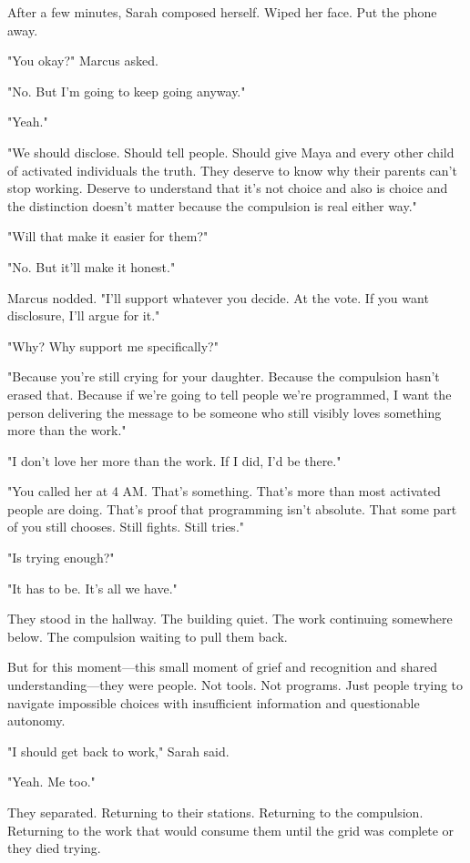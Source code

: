 After a few minutes, Sarah composed herself. Wiped her face. Put the phone away.

"You okay?" Marcus asked.

"No. But I'm going to keep going anyway."

"Yeah."

"We should disclose. Should tell people. Should give Maya and every other child of activated individuals the truth. They deserve to know why their parents can't stop working. Deserve to understand that it's not choice and also is choice and the distinction doesn't matter because the compulsion is real either way."

"Will that make it easier for them?"

"No. But it'll make it honest."

Marcus nodded. "I'll support whatever you decide. At the vote. If you want disclosure, I'll argue for it."

"Why? Why support me specifically?"

"Because you're still crying for your daughter. Because the compulsion hasn't erased that. Because if we're going to tell people we're programmed, I want the person delivering the message to be someone who still visibly loves something more than the work."

"I don't love her more than the work. If I did, I'd be there."

"You called her at 4 AM. That's something. That's more than most activated people are doing. That's proof that programming isn't absolute. That some part of you still chooses. Still fights. Still tries."

"Is trying enough?"

"It has to be. It's all we have."

They stood in the hallway. The building quiet. The work continuing somewhere below. The compulsion waiting to pull them back.

But for this moment—this small moment of grief and recognition and shared understanding—they were people. Not tools. Not programs. Just people trying to navigate impossible choices with insufficient information and questionable autonomy.

"I should get back to work," Sarah said.

"Yeah. Me too."

They separated. Returning to their stations. Returning to the compulsion. Returning to the work that would consume them until the grid was complete or they died trying.

